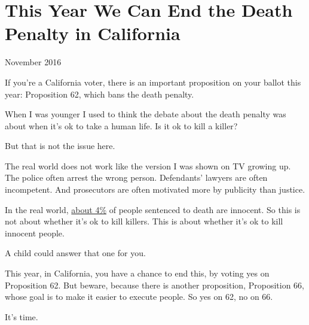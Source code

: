 \chapter{This Year We Can End the Death Penalty in California}



November 2016

If you're a California voter, there is an important proposition
on your ballot this year: Proposition 62, which bans the death
penalty.

When I was younger I used to think the debate about the death
penalty was about when it's ok to take a human life.  Is it ok
to kill a killer?

But that is not the issue here.

The real world does not work like the version I was shown on TV growing up.  The police 
often arrest the wrong person.
Defendants' lawyers are often incompetent.  And prosecutors
are often motivated more by publicity than justice.

In the real world,       
\href{http://time.com/79572/more-innocent-people-on-death-row-than-estimated-study/}{about 4\%} of people sentenced to death
are innocent.
So this is not about whether it's ok to kill killers. This
is about whether it's ok to kill innocent people.

A child could answer that one for you.

This year, in California, you have a chance to end this, by
voting yes on Proposition 62. But beware, because there is another 
proposition, Proposition 66, whose goal is to make it 
easier to execute people. So yes on 62, no on 66.

It's time.




